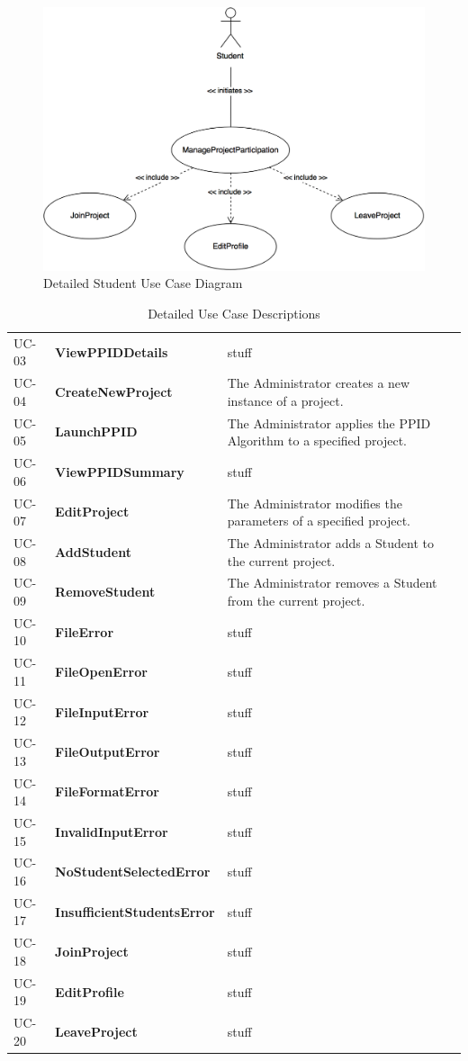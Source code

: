 \documentclass[12pt,letterpaper]{article}
\begin{document}
\begin{figure}[H]
	\centering{}
	\includegraphics[scale=0.23]{imgs/detailed-student-use-case-diagram.png}
	\caption{Detailed Student Use Case Diagram}
\end{figure}

\begin{table}[H]
	\caption{Detailed Use Case Descriptions}
	\begin{tabu} to 
		UC-03 & ViewPPIDDetails & stuff\\
		UC-04 & CreateNewProject & The Administrator creates a new instance of a project.\\
		UC-05 & LaunchPPID & The Administrator applies the PPID Algorithm to a specified project.\\
		UC-06 & ViewPPIDSummary & stuff\\
		UC-07 & EditProject & The Administrator modifies the parameters of a specified project.\\
		UC-08 & AddStudent & The Administrator adds a Student to the current project.\\
		UC-09 & RemoveStudent & The Administrator removes a Student from the current project.\\
		UC-10 & FileError & stuff\\
		UC-11 & FileOpenError & stuff\\
		UC-12 & FileInputError & stuff\\
		UC-13 & FileOutputError & stuff\\
		UC-14 & FileFormatError & stuff\\
		UC-15 & InvalidInputError & stuff\\
		UC-16 & NoStudentSelectedError & stuff\\
		UC-17 & InsufficientStudentsError & stuff\\
		UC-18 & JoinProject & stuff\\
		UC-19 & EditProfile & stuff\\
		UC-20 & LeaveProject & stuff\\
	\end{tabu}
\end{table}
\end{document}
